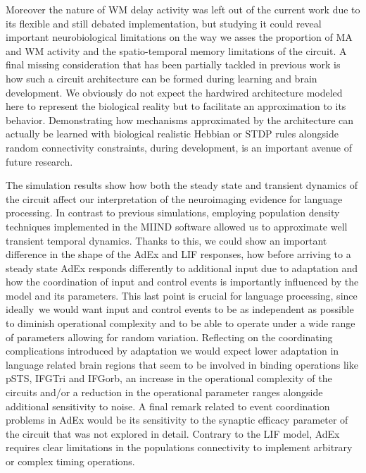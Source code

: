 \documentclass[10pt]{article}
\begin{document}
Moreover the nature of WM delay activity was left out of the current work due to its flexible and still debated implementation\cite{de_Kamps_2005}, but studying it could reveal important neurobiological limitations on the way we asses the proportion of MA and WM activity and the spatio-temporal memory limitations of the circuit.
A final missing consideration that has been partially tackled in previous work\cite{van_der_Velde_2011} is how such a circuit architecture can be formed during learning and brain development.
We obviously do not expect the hardwired architecture modeled here to represent the biological reality but to facilitate an approximation to its behavior.
Demonstrating how mechanisms approximated by the architecture can actually be learned with biological realistic Hebbian or STDP rules alongside random connectivity constraints, during development, is an important avenue of future research.

The simulation results show how both the steady state and transient dynamics of the circuit affect our interpretation of the neuroimaging evidence for language processing.
In contrast to previous simulations\cite{van_der_Velde_2011,van_der_Velde_2010,Frank_2014,van_Dijk_2015}, employing population density techniques implemented in the MIIND software\cite{de_Kamps_2008} allowed us to approximate well transient temporal dynamics.
Thanks to this, we could show an important difference in the shape of the AdEx and LIF responses, how before arriving to a steady state AdEx responds differently to additional input due to adaptation and how the coordination of input and control events is importantly influenced by the model and its parameters.
This last point is crucial for language processing, since ideally~we would want input and control events to be as independent as possible to diminish operational complexity and to be able to operate under a wide range of parameters allowing for random variation.
Reflecting on the coordinating complications introduced by adaptation we would expect lower adaptation in language related brain regions that seem to be involved in binding operations like pSTS, IFGTri and IFGorb, an increase in the operational complexity of the circuits and/or a reduction in the operational parameter ranges alongside additional sensitivity to noise.
A final remark related to event coordination problems in AdEx would be its sensitivity to the synaptic efficacy parameter of the circuit that was not explored in detail.
Contrary to the LIF model, AdEx requires clear limitations in the populations connectivity to implement arbitrary or complex timing operations.
\end{document}

